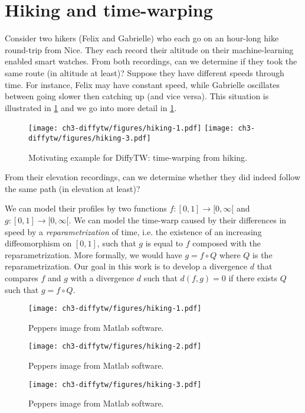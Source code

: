 \section{Hiking and time-warping}\label{sec:appendix-hiking}
Consider two hikers (Felix and Gabrielle) who each go on an hour-long hike round-trip from Nice. They each record their altitude on their machine-learning enabled smart watches. From both recordings, can we determine if they took the same route (in altitude at least)? Suppose they have different speeds through time. For instance, Felix may have constant speed, while Gabrielle oscillates between going slower then catching up (and vice versa). This situation is illustrated in \cref{fig:hiking} and we go into more detail in \cref{sec:appendix-hiking}.

\begin{figure}[!h]
    \centering
    \texttt{[image: ch3-diffytw/figures/hiking-1.pdf]}
    \texttt{[image: ch3-diffytw/figures/hiking-3.pdf]}
    \caption[Hiking example for DiffyTW.]{Motivating example for DiffyTW: time-warping from hiking.}\label{fig:hiking}
\end{figure}

From their elevation recordings, can we determine whether they did indeed follow the same path (in elevation at least)?

We can model their profiles by two functions $f:[0,1] \to [0, \infty[$ and $g:[0, 1] \to [0, \infty[$. We can model the time-warp caused by their differences in speed by a \emph{reparametrization} of time, i.e. the existence of an increasing diffeomorphism on $[0,1]$, such that $g$ is equal to $f$ composed with the reparametrization. More formally, we would have $g = f \circ Q$ where $Q$ is the reparametrization. Our goal in this work is to develop a divergence $d$ that compares $f$ and $g$ with a divergence $d$ such that $d(f, g)=0$ if there exists $Q$ such that $g = f \circ Q$.\begin{figure}[!h]
    \centering
    \texttt{[image: ch3-diffytw/figures/hiking-1.pdf]}
    \caption[Sample image for Diffy experiments.]{Peppers image from Matlab software.}
\end{figure}
\begin{figure}[!h]
    \centering
    \texttt{[image: ch3-diffytw/figures/hiking-2.pdf]}
    \caption[Sample image for Diffy experiments.]{Peppers image from Matlab software.}
\end{figure}
\begin{figure}[!h]
    \centering
    \texttt{[image: ch3-diffytw/figures/hiking-3.pdf]}
    \caption[Sample image for Diffy experiments.]{Peppers image from Matlab software.}
\end{figure}

